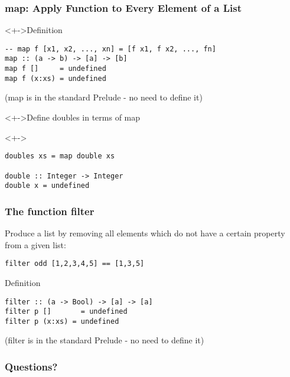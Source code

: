 \documentclass{beamer}
\begin{document}
\begin{frame}[fragile]
  \frametitle{\textbf{map}: Apply Function to Every Element of a List}
  \begin{block}<+->{Definition}
\begin{lstlisting}
-- map f [x1, x2, ..., xn] = [f x1, f x2, ..., fn]
map :: (a -> b) -> [a] -> [b]
map f []     = undefined
map f (x:xs) = undefined
\end{lstlisting}
    (map is in the standard Prelude - no need to define it)
  \end{block}
  \begin{alertblock}<+->{Define doubles in terms of map}
  \end{alertblock}
  \begin{block}<+->{}
\begin{lstlisting}
doubles xs = map double xs

double :: Integer -> Integer
double x = undefined
\end{lstlisting}
  \end{block}
\end{frame}
\begin{frame}[fragile]
  \frametitle{The function \textbf{filter}}
  Produce a list by removing all elements 
  which do not have a certain property from 
  a given list: 

\begin{lstlisting}
filter odd [1,2,3,4,5] == [1,3,5]
\end{lstlisting}

  \begin{block}{Definition}
\begin{lstlisting}
filter :: (a -> Bool) -> [a] -> [a]
filter p []       = undefined
filter p (x:xs) = undefined
\end{lstlisting}
(filter is in the standard Prelude - no need to define it)
  \end{block}
\end{frame}

\begin{frame}
  \frametitle{Questions?}
  \begin{center}
  \end{center}
\end{frame}
\end{document}
